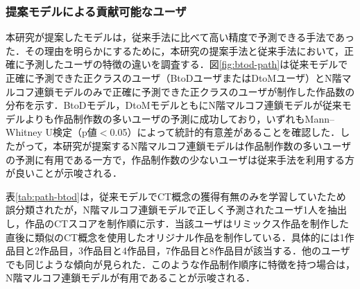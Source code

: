 \documentclass[submit]{ipsj}
\begin{document}
\subsubsection{提案モデルによる貢献可能なユーザ}

本研究が提案したモデルは，従来手法に比べて高い精度で予測できる手法であった．その理由を明らかにするために，本研究の提案手法と従来手法において，正確に予測したユーザの特徴の違いを調査する．図\ref{fig:btod-path}は従来モデルで正確に予測できた正クラスのユーザ（BtoDユーザまたはDtoMユーザ）とN階マルコフ連鎖モデルのみで正確に予測できた正クラスのユーザが制作した作品数の分布を示す．BtoDモデル，DtoMモデルともにN階マルコフ連鎖モデルが従来モデルよりも作品制作数の多いユーザの予測に成功しており，いずれもMann–Whitney U検定（p値$<$0.05）によって統計的有意差があることを確認した．したがって，本研究が提案するN階マルコフ連鎖モデルは作品制作数の多いユーザの予測に有用である一方で，作品制作数の少ないユーザは従来手法を利用する方が良いことが示唆される．

表\ref{tab:path-btod}は，従来モデルでCT概念の獲得有無のみを学習していたため誤分類されたが，N階マルコフ連鎖モデルで正しく予測されたユーザ1人を抽出し，作品のCTスコアを制作順に示す．当該ユーザはリミックス作品を制作した直後に類似のCT概念を使用したオリジナル作品を制作している．具体的には1作品目と2作品目，3作品目と4作品目，7作品目と8作品目が該当する．他のユーザでも同じような傾向が見られた．このような作品制作順序に特徴を持つ場合は，N階マルコフ連鎖モデルが有用であることが示唆される．



\end{document}
